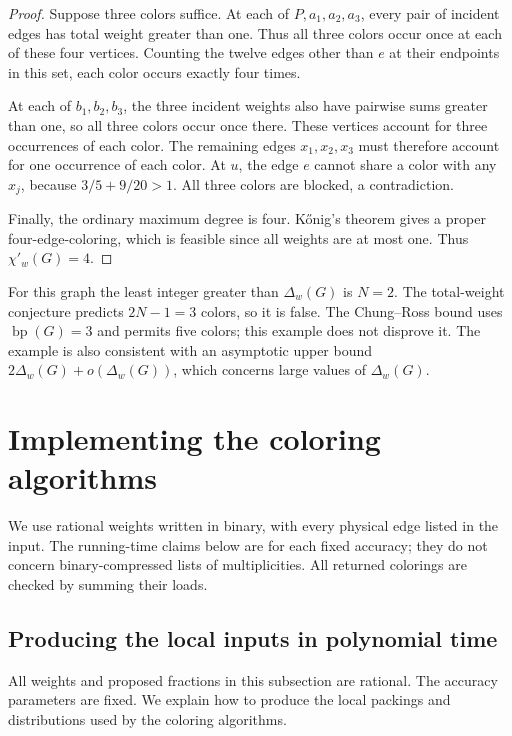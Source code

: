 \documentclass[11pt]{article}
\theoremstyle{definition}\newtheorem{algorithm}{Algorithm}[section]
\numberwithin{equation}{section}
\theoremstyle{remark}\newtheorem*{remark}{Remark}
\newcommand{\bp}{\operatorname{bp}}
\begin{document}
\begin{proof}
Suppose three colors suffice. At each of $P,a_1,a_2,a_3$, every pair
of incident edges has total weight greater than one. Thus all three
colors occur once at each of these four vertices. Counting the twelve
edges other than $e$ at their endpoints in this set, each color occurs
exactly four times.

At each of $b_1,b_2,b_3$, the three incident weights also have pairwise
sums greater than one, so all three colors occur once there. These
vertices account for three occurrences of each color. The remaining
edges $x_1,x_2,x_3$ must therefore account for one occurrence of each
color. At $u$, the edge $e$ cannot share a color with any $x_j$,
because $3/5+9/20>1$. All three colors are blocked, a contradiction.

Finally, the ordinary maximum degree is four. K\H{o}nig's theorem
gives a proper four-edge-coloring, which is feasible since all weights
are at most one. Thus $\chi'_w(G)=4$.
\end{proof}

For this graph the least integer greater than $\Delta_w(G)$ is $N=2$.
The total-weight conjecture predicts $2N-1=3$ colors, so it is false.
The Chung--Ross bound uses $\bp(G)=3$ and permits five colors; this
example does not disprove it. The example is also consistent with an
asymptotic upper bound $2\Delta_w(G)+o(\Delta_w(G))$, which concerns
large values of $\Delta_w(G)$.

\section{Implementing the coloring algorithms}\label{sec:algorithms}
We use rational weights written in binary, with every physical edge
listed in the input. The running-time claims below are for each fixed
accuracy; they do not concern binary-compressed lists of multiplicities.
All returned colorings are checked by summing their loads.

\subsection{Producing the local inputs in polynomial time}
\label{sec:local-input-algorithms}
All weights and proposed fractions in this subsection are rational.
The accuracy parameters are fixed. We explain how to produce the local
packings and distributions used by the coloring algorithms.
\end{document}
